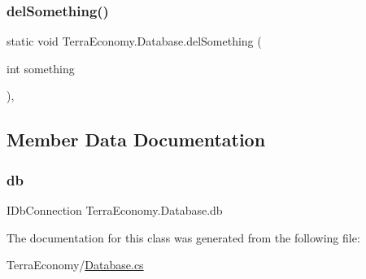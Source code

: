 \mbox{\label{class_terra_economy_1_1_database_a007912559f4aae3ac46bf61226c7ce61}} 
\subsubsection{\texorpdfstring{del\+Something()}{delSomething()}}
{\footnotesize\ttfamily static void Terra\+Economy.\+Database.\+del\+Something (\begin{DoxyParamCaption}\item[{int}]{something }\end{DoxyParamCaption})\hspace{0.3cm}{\ttfamily [inline]}, {\ttfamily [static]}}



\subsection{Member Data Documentation}
\mbox{\label{class_terra_economy_1_1_database_a2290bf1e9dc5cd26715ef001c8e119df}} 
\subsubsection{\texorpdfstring{db}{db}}
{\footnotesize\ttfamily I\+Db\+Connection Terra\+Economy.\+Database.\+db\hspace{0.3cm}{\ttfamily [static]}}



The documentation for this class was generated from the following file\+:\begin{DoxyCompactItemize}
\item 
Terra\+Economy/\hyperlink{_database_8cs}{Database.\+cs}\end{DoxyCompactItemize}
